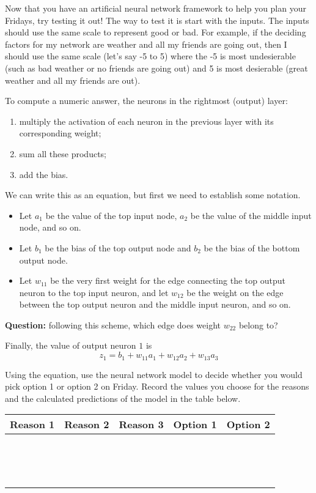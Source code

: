 \documentclass[11pt]{article}
\begin{document}
Now that you have an artificial neural network framework to help you plan your Fridays, try testing it out! The way to
test it is start with the inputs. The inputs should use the same scale to represent good or bad. For example, if the
deciding factors for my network are weather and all my friends are going out, then I should use the same scale (let's
say -5 to 5) where the -5 is most undesierable (such as bad weather or no friends are going out) and 5 is most
desierable (great weather and all my friends are out).

To compute a numeric answer, the neurons in the rightmost (output) layer:
\begin{enumerate}
  \item
    multiply the activation of each neuron in the previous layer with its
    corresponding weight;
  \item
    sum all these products;
  \item
    add the bias.
\end{enumerate}
%
We can write this as an equation, but first we need to establish some notation.
%
\begin{itemize}
  \item
    Let $a_1$ be the value of the top input node, $a_2$ be the value of the
    middle input node, and so on.
  \item
    Let $b_1$ be the bias of the top output node and $b_2$ be the bias of the
    bottom output node.
  \item
    Let $w_{11}$ be the very first weight for the edge connecting the top output
    neuron to the top input neuron, and let $w_{12}$ be the weight on the edge
    between the top output neuron and the middle input neuron, and so on.
\end{itemize}
%
\textbf{Question:} following this scheme, which edge does weight $w_{22}$ belong
to?

Finally, the value of output neuron $1$ is
\[
z_1 = b_1 + w_{11} a_1 + w_{12} a_2 + w_{13} a_3
\]

Using the equation, use the neural network model to decide whether you would
pick option 1 or option 2 on Friday. Record the values you choose for the
reasons and the calculated predictions of the model in the table below.

\begin{center}
  \newcommand{\size}{7em}
  \renewcommand{\arraystretch}{2}
  \begin{tabular}{| p{\size} | p{\size} | p{\size} | p{\size} | p{\size} |}
    \hline
    \textbf{Reason 1} & \textbf{Reason 2}
    & \textbf{Reason 3}
    & \textbf{Option 1}
    & \textbf{Option 2}
    \\ \hline
    ~ & ~ & ~ & ~ & ~ \\ \hline
    ~ & ~ & ~ & ~ & ~ \\ \hline
    ~ & ~ & ~ & ~ & ~ \\ \hline
  \end{tabular}
\end{center}
\end{document}
